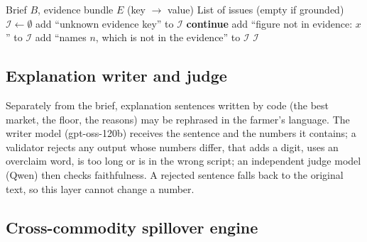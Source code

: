 \begin{algorithm}[!t]
\caption{Grounding verification of a decision brief}
\label{alg:grounding}
\begin{algorithmic}[1]
\Require Brief $B$, evidence bundle $E$ (key $\rightarrow$ value)
\Ensure List of issues (empty if grounded)
\State $\mathcal{I}\gets\emptyset$
     \State add ``unknown evidence key'' to $\mathcal{I}$ \EndIf
\EndFor
{}
     \State \textbf{continue} \EndIf
     \State add ``figure not in evidence: $x$'' to $\mathcal{I}$ \EndIf
\EndFor
{}
     \State add ``names $n$, which is not in the evidence'' to $\mathcal{I}$ \EndIf
\EndFor
\State \Return $\mathcal{I}$
\end{algorithmic}
\end{algorithm}

\subsection{Explanation writer and judge}

Separately from the brief, explanation sentences written by code (the best market, the floor, the reasons) may be rephrased in the farmer's language. The writer model (gpt-oss-120b) receives the sentence and the numbers it contains; a validator rejects any output whose numbers differ, that adds a digit, uses an overclaim word, is too long or is in the wrong script; an independent judge model (Qwen) then checks faithfulness. A rejected sentence falls back to the original text, so this layer cannot change a number.

\subsection{Cross-commodity spillover engine}

